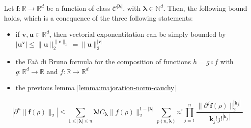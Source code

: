 ﻿\documentclass{article}
\begin{document}
\begin{corollary}\label{corollary:majoration-norm-cauchy}
  Let $\bm f : \mathbb R\to\mathbb R^d$ be a function of class $\mathcal C^{|\bm\lambda|}$, with $\bm\lambda\in\mathbb N^d$. Then, the following bound holds, which is a conequence of the three following statements:
  \begin{itemize}
    \item if $\bm v, \bm u\in \mathbb R^d$, then vectorial exponentitation can be simply bounded by  $\left|\bm u^{\bm v}\right|\leq \|\bm u\|_2^{\|\bm v\|_1}=\|\bm u\|_2^{|\bm v|}$
    \item the Faà di Bruno formula for the composition of functions $h = g\circ f$ with $g : \mathbb R^d\to\mathbb R$ and $f : \mathbb R\to\mathbb R^d$
    \item the previous lemma \ref{lemma:majoration-norm-cauchy}
  \end{itemize}

\begin{equation}
  \left|\partial^{n}\|\bm f(\rho)\|_2\right| \leq \sum_{1\leq |\bm\lambda|\leq n}\bm\lambda !C_{\bm\lambda}\|f(\rho)\|_2^{1-|\bm\lambda|}\sum_{p(n,\bm\lambda)}n!\prod_{j=1}^{n}\frac{\|\partial^j\bm f(\rho)\|_2^{|\bm k_j|}}{\bm k_j!j!^{|\bm k_j|}}
\end{equation}
\end{corollary}




\end{document}
